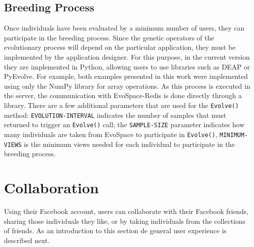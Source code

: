 \documentclass{sig-alternate}
\begin{document}
\subsection{Breeding Process}
Once individuals have been evaluated by a minimum number of users, they can participate in the breeding process. Since the genetic operators of the evolutionary process will depend on the particular application, they must be implemented by the application designer. For this purpose, in the current version they are implemented in Python, allowing users to use libraries such as DEAP or PyEvolve. For example, both examples presented in this work were implemented using only the NumPy library for array operations. As this process is executed in the server, the communication with EvoSpace-Redis is done directly through a library. There are a few additional parameters that are used for the \texttt{Evolve()} method: \texttt{EVOLUTION-INTERVAL} indicates the number of samples that must returned to trigger an \texttt{Evolve()} call; the \texttt{SAMPLE-SIZE} parameter indicates how many individuals are taken from EvoSpace to participate in \texttt{Evolve()}, \texttt{MINIMUM-VIEWS} is the minimum views needed for each individual to participate in the breeding process.

\section{Collaboration}
Using their Facebook account, users can collaborate with their Facebook friends, sharing those individuals they like, or by taking individuals from the collections of friends. As an introduction to this section de general user experience is described next.
\end{document}
